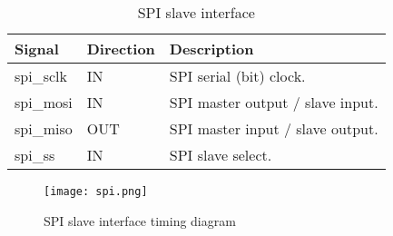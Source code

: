 \documentclass{ug}
\theoremstyle{plain}
\begin{document}
\begin{table}[H]
  \begin{center}
    \begin{tabular}{|l|l|l|}
      \hline

      \rowcolor{iob-green}
      \textbf{Signal} & \textbf{Direction} & \textbf{Description} \\
      \hline
      \hline

      spi\_sclk & IN & SPI serial (bit) clock.\\ \hline

      \rowcolor{iob-blue} spi\_mosi & IN & SPI master output / slave
      input.\\ \hline

      spi\_miso & OUT & SPI master input / slave output.\\ \hline

      \rowcolor{iob-blue} spi\_ss & IN & SPI slave select. \\ \hline

    \end{tabular}
    \caption{SPI slave interface}
    \label{tab:spi}
  \end{center}
\end{table}

\begin{figure}[H]
  \begin{center}
    \texttt{[image: spi.png]}
    \caption{SPI slave interface timing diagram}
    \label{fig:spi}
  \end{center}
\end{figure}





%
%
\end{document}
